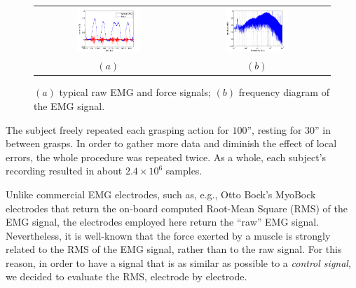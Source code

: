 \begin{figure}[!ht] \centering
  \begin{tabular}{cc}
    \includegraphics[width=0.45\textwidth]{figs/force_raw} &
    \includegraphics[width=0.45\textwidth]{figs/spectrum_raw} \\
    $(a)$ & $(b)$ \\
  \end{tabular}
  \caption{$(a)$ typical raw EMG and force signals; $(b)$ frequency diagram of
    the EMG signal.}
  \label{fig:spectra}
\end{figure}

The subject freely repeated each grasping action
for $100$'', resting for $30$'' in between grasps. In order to gather
more data and diminish the effect of local errors, the whole procedure
was repeated twice. As a whole, each subject's recording resulted in
about $2.4\times 10^6$ samples. 

Unlike commercial EMG electrodes, such as, e.g., Otto Bock's MyoBock
electrodes \cite{ottobock} that return the on-board computed Root-Mean
Square (RMS) of the EMG signal, the electrodes employed here return
the ``raw'' EMG signal.%
Nevertheless, it is well-known \cite{deluca,zecca} that the force
exerted by a muscle is strongly related to the RMS of the EMG signal,
rather than to the raw signal. For this reason, in order to have a
signal that is as similar as possible to a \emph{control signal}, we
decided to evaluate the RMS, electrode by electrode.

